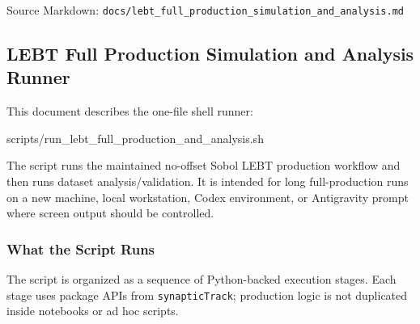 \documentclass[
]{article}
\newenvironment{Shaded}{}{}
\newcommand{\ExtensionTok}[1]{#1}
\begin{document}
Source Markdown:
\texttt{docs/lebt\_full\_production\_simulation\_and\_analysis.md}

\hypertarget{lebt-full-production-simulation-and-analysis-runner}{%
\subsection{LEBT Full Production Simulation and Analysis
Runner}\label{lebt-full-production-simulation-and-analysis-runner}}

This document describes the one-file shell runner:

\begin{Shaded}
\begin{Highlighting}[]
\ExtensionTok{scripts/run\_lebt\_full\_production\_and\_analysis.sh}
\end{Highlighting}
\end{Shaded}

The script runs the maintained no-offset Sobol LEBT production workflow
and then runs dataset analysis/validation. It is intended for long
full-production runs on a new machine, local workstation, Codex
environment, or Antigravity prompt where screen output should be
controlled.

\hypertarget{what-the-script-runs}{%
\subsubsection{What the Script Runs}\label{what-the-script-runs}}

The script is organized as a sequence of Python-backed execution stages.
Each stage uses package APIs from \texttt{synapticTrack}; production
logic is not duplicated inside notebooks or ad hoc scripts.
\end{document}
